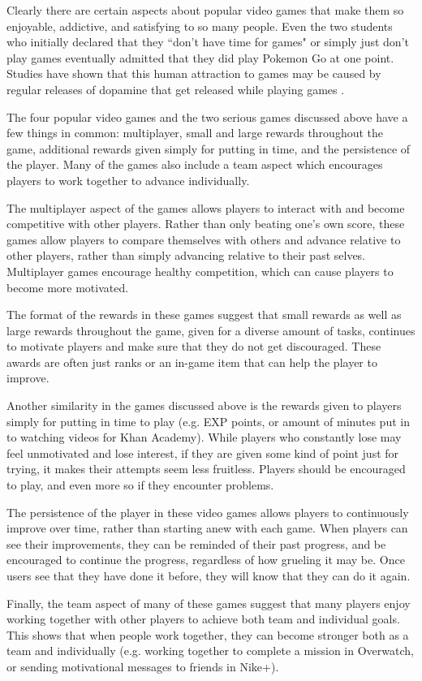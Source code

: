 Clearly there are certain aspects about popular video games that make them so enjoyable, addictive, and satisfying to so many people. Even the two students who initially declared that they ``don't have time for games" or simply just don't play games eventually admitted that they did play Pokemon Go at one point. Studies have shown that this human attraction to games may be caused by regular releases of dopamine that get released while playing games \cite{Koepp}. 

The four popular video games and the two serious games discussed above have a few things in common: multiplayer, small and large rewards throughout the game, additional rewards given simply for putting in time, and the persistence of the player. Many of the games also include a team aspect which encourages players to work together to advance individually. 

The multiplayer aspect of the games allows players to interact with and become competitive with other players. Rather than only beating one's own score, these games allow players to compare themselves with others and advance relative to other players, rather than simply advancing relative to their past selves. Multiplayer games encourage healthy competition, which can cause players to become more motivated.   

The format of the rewards in these games suggest that small rewards as well as large rewards throughout the game, given for a diverse amount of tasks, continues to motivate players and make sure that they do not get discouraged. These awards are often just ranks or an in-game item that can help the player to improve. 

Another similarity in the games discussed above is the rewards given to players simply for putting in time to play (e.g. EXP points, or amount of minutes put in to watching videos for Khan Academy). While players who constantly lose may feel unmotivated and lose interest, if they are given some kind of point just for trying, it makes their attempts seem less fruitless. Players should be encouraged to play, and even more so if they encounter problems. 

The persistence of the player in these video games allows players to continuously improve over time, rather than starting anew with each game. When players can see their improvements, they can be reminded of their past progress, and be encouraged to continue the progress, regardless of how grueling it may be. Once users see that they have done it before, they will know that they can do it again. 

Finally, the team aspect of many of these games suggest that many players enjoy working together with other players to achieve both team and individual goals. This shows that when people work together, they can become stronger both as a team and individually (e.g. working together to complete a mission in Overwatch, or sending motivational messages to friends in Nike+). 

\nocite {Carini}
\nocite {Junco}
\nocite {Kuh}
\nocite {Chen}
\nocite {Handelsman}
\nocite {Junco2011}
\nocite {Zhao}
\nocite {Kuh2001}
\nocite {Kuh2003}
\nocite {Huang}

